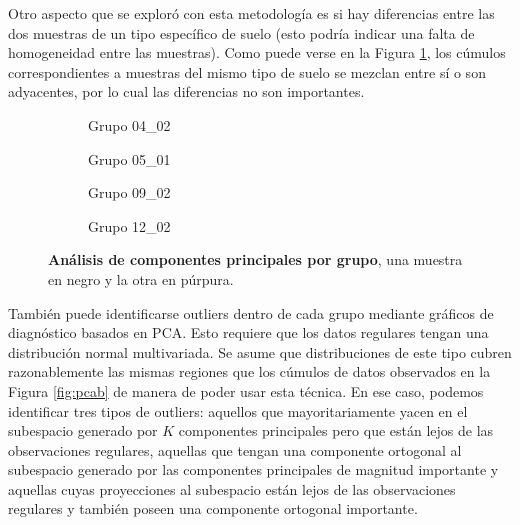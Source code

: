\documentclass[12pt]{article}
\begin{document}
Otro aspecto que se exploró con esta metodología es si hay diferencias entre las dos muestras de un tipo específico de suelo (esto podría indicar una falta de homogeneidad entre las muestras). Como puede verse en la Figura \ref{fig:grouppca}, los cúmulos correspondientes a muestras del mismo tipo de suelo se mezclan entre sí o son adyacentes, por lo cual las diferencias no son importantes.

\begin{figure}[htbp]
    \centering
    \begin{subfigure}[b]{0.45\textwidth}
        \caption{Grupo 04\_02}
        
    \end{subfigure}
    \begin{subfigure}[b]{0.45\textwidth}
        \caption{Grupo 05\_01}
        
    \end{subfigure}
    \begin{subfigure}[b]{0.45\textwidth}
        \caption{Grupo 09\_02}
        
    \end{subfigure}
    \begin{subfigure}[b]{0.45\textwidth}
        \caption{Grupo 12\_02}
        
    \end{subfigure}
    \caption{\textbf{Análisis de componentes principales por grupo}, una muestra en negro y la otra en púrpura.}  
    \label{fig:grouppca}
\end{figure}

También puede identificarse outliers dentro de cada grupo mediante gráficos de diagnóstico basados en PCA\cite{PCA}. Esto requiere que los datos regulares tengan una distribución normal multivariada. Se asume que distribuciones de este tipo cubren razonablemente las mismas regiones que los cúmulos de datos observados en la Figura \ref{fig:pcab} de manera de poder usar esta técnica. En ese caso, podemos identificar tres tipos de outliers: aquellos que mayoritariamente yacen en el subespacio generado por $K$ componentes principales pero que están lejos de las observaciones regulares, aquellas que tengan una componente ortogonal al subespacio generado por las componentes principales de magnitud importante y aquellas cuyas proyecciones al subespacio están lejos de las observaciones regulares y también poseen una componente ortogonal importante. 
\end{document}
